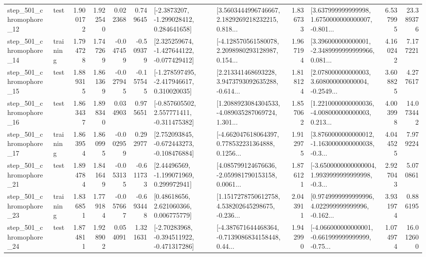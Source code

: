 \begin{tabular}{llrrrrllrlrr}
  step\_501\_chromophore\_12 &      test &      1.900172 &    1.922540 &      0.022368 &  0.749645 &     [-2.3873207, -1.299028412, 0.284641658] &  [3.5603444996746667, 2.1829269218232215, 0.818... &       1.836733 &  [3.637999999999998, 1.6750000000000007, -0.801... &            6.537995 &         23.389376 \\
  step\_501\_chromophore\_14 &  training &      1.794728 &    1.747269 &     -0.047459 & -0.509379 &   [2.325259674, -1.427644122, -0.077429412] &  [-4.128570561580078, 2.2098980293128987, 0.154... &       1.967194 &  [3.396000000000001, -2.3489999999999966, 0.081... &            4.160242 &          7.177221 \\
  step\_501\_chromophore\_15 &      test &      1.889315 &    1.861369 &     -0.027945 & -0.157545 &   [-1.278597495, -2.417946617, 0.310020035] &  [2.213341468693228, 3.9473793092635288, -0.614... &       1.818124 &  [2.078000000000003, 3.608000000000004, -0.2549... &            3.608825 &          4.277617 \\
  step\_501\_chromophore\_16 &      test &      1.863437 &    1.898340 &      0.034903 &  0.975651 &   [-0.857605502, 2.557771411, -0.311475382] &  [1.2088923084304533, -4.089035287069724, 1.301... &       1.857062 &  [1.2210000000000036, -4.008000000000003, 0.213... &            4.003998 &         14.073442 \\
  step\_501\_chromophore\_17 &  training &      1.863954 &    1.860995 &     -0.002959 &  0.292977 &   [2.752093845, -0.672443273, -0.108476884] &  [-4.662047618064397, 0.778532231364888, 0.1256... &       1.912975 &  [3.8760000000000012, -1.1630000000000038, -0.3... &            4.044525 &          7.979224 \\
  step\_501\_chromophore\_21 &      test &      1.894784 &    1.841649 &     -0.053135 & -0.611733 &     [2.44496569, -1.199071969, 0.299972941] &  [4.085799124676636, -2.059981790153158, 0.0061... &       1.876121 &  [-3.6500000000000004, 1.9939999999999998, -0.3... &            2.927043 &          5.070861 \\
  step\_501\_chromophore\_23 &  training &      1.836851 &    1.779184 &     -0.057667 & -0.693448 &      [0.48618656, 2.621060366, 0.006775779] &  [1.1517278750612758, 4.538202645298675, -0.236... &       2.043911 &  [0.9749999999999996, 4.022999999999996, -0.162... &            3.931974 &          0.886195 \\
  step\_501\_chromophore\_24 &      test &      1.874811 &    1.928902 &      0.054091 &  1.321631 &   [-2.70283968, -0.394511922, -0.471317286] &  [-4.387671644468364, -0.7139086834158448, 0.44... &       1.942990 &  [-4.066000000000001, -0.661999999999999, -0.75... &            1.074974 &         16.012600 \\

\end{tabular}
